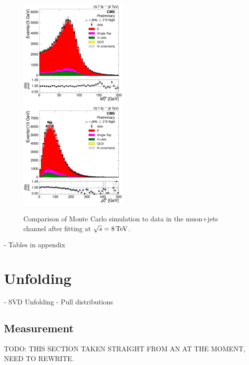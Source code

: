\begin{figure}[hbtp]
     \includegraphics[width=0.48\textwidth]{Chapters/04_Analysis/04b_XSections/images/control_plots/after_fit/8TeV/MuPlusJets_patType1CorrectedPFMet_MT_2orMoreBtags_with_ratio.pdf}\\     
	 \includegraphics[width=0.48\textwidth]{Chapters/04_Analysis/04b_XSections/images/control_plots/after_fit/8TeV/MuPlusJets_patType1CorrectedPFMet_WPT_2orMoreBtags_with_ratio.pdf}\hfill
	 \caption{Comparison of Monte Carlo simulation to data in the muon+jets channel after fitting at
	 $\sqrt{s}=8\,\text{Te\hspace{-.08em}V}$.}
     \label{fig:data_mc_comparison_after_fit_8TeV_muon}
\end{figure}

- Tables in appendix

\section{Unfolding}
\label{ss:unfolding}
		- SVD Unfolding
		- Pull distributions

\subsection{Measurement}
\label{ss:measurement}
TODO: THIS SECTION TAKEN STRAIGHT FROM AN AT THE MOMENT, NEED TO REWRITE.

